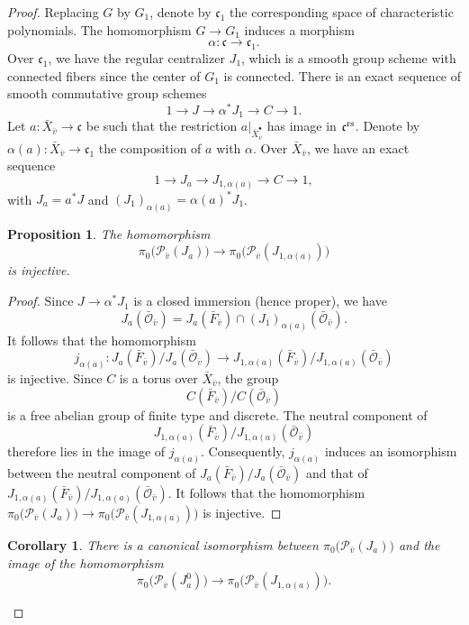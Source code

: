 \documentclass[12pt,english]{smfart}
\numberwithin{equation}{subsection}
\newtheorem{proposition}[equation]{Proposition}
\newtheorem{corollary}[equation]{Corollary}
\theoremstyle{remark}
\newcommand\calP{{\mathscr P}}
\newcommand\calO{{\mathscr O}}
\newcommand\frakc{{\mathfrak c}}
\newcommand\rs{{\rm rs}}
\begin{document}
\begin{proof}
Replacing $G$ by $G_1$, denote by $\frakc_1$ the corresponding space of characteristic polynomials. The homomorphism $G\rightarrow G_1$ induces a morphism
$$
\alpha:\frakc\rightarrow \frakc_1.
$$
Over $\frakc_1$, we have the regular centralizer $J_1$, which is a smooth group scheme with connected fibers since the center of $G_1$ is connected. There is an exact sequence of smooth commutative group schemes
$$
1\rightarrow J\rightarrow \alpha^*J_1\rightarrow C\rightarrow 1.
$$
Let $a:\bar X_{\bar v}\rightarrow \frakc$ be such that the restriction $a|_{\bar X_{\bar v}^\bullet}$ has image in $\frakc^\rs$. Denote by $\alpha(a):\bar X_{\bar v}\rightarrow \frakc_1$ the composition of $a$ with $\alpha$. Over $\bar X_{\bar v}$, we have an exact sequence
$$
1\rightarrow J_a\rightarrow J_{1,\alpha(a)}\rightarrow C\rightarrow 1,
$$
with $J_a=a^*J$ and $(J_1)_{\alpha(a)}=\alpha(a)^*J_1$.

\begin{proposition}
The homomorphism 
$$
\pi_0\bigl(\calP_{\bar v}(J_a)\bigr) \to \pi_0\bigl(\calP_{\bar v}(J_{1,\alpha(a)})\bigr)
$$ 
is injective.
\end{proposition}

\begin{proof}
Since $J\to \alpha^*J_1$ is a closed immersion (hence proper), we have
$$
J_a(\bar\calO_{\bar v}) = J_a(\bar F_{\bar v})\cap (J_1)_{\alpha(a)}(\bar\calO_{\bar v}).
$$
It follows that the homomorphism
$$
j_{\alpha(a)}:J_a(\bar F_{\bar v})/J_a(\bar\calO_{\bar v}) \to
J_{1,\alpha(a)}(\bar F_{\bar v})/J_{1,\alpha(a)}(\bar\calO_{\bar v})
$$
is injective. Since $C$ is a torus over $\bar X_{\bar v}$, the group
$$
C(\bar F_{\bar v})/C(\bar\calO_{\bar v})
$$
is a free abelian group of finite type and discrete. The neutral component of
$$
J_{1,\alpha(a)}(\bar F_{\bar v})/J_{1,\alpha(a)}(\bar\calO_{\bar v})
$$
therefore lies in the image of $j_{\alpha(a)}$. Consequently, $j_{\alpha(a)}$ induces an isomorphism between the neutral component of $J_a(\bar F_{\bar v})/J_a(\bar\calO_{\bar v})$ and that of $J_{1,\alpha(a)}(\bar F_{\bar v})/J_{1,\alpha(a)}(\bar\calO_{\bar v})$. It follows that the homomorphism $\pi_0\bigl(\calP_{\bar v}(J_a)\bigr)\to \pi_0\bigl(\calP_{\bar v}(J_{1,\alpha(a)})\bigr)$ is injective.
\end{proof}

\begin{corollary}
There is a canonical isomorphism between $\pi_0\bigl(\calP_{\bar v}(J_a)\bigr)$ and the image of the homomorphism
$$
\pi_0\bigl(\calP_{\bar v}(J_a^0)\bigr)\to \pi_0\bigl(\calP_{\bar v}(J_{1,\alpha(a)})\bigr).
$$
\end{corollary}


\end{proof}
\end{document}

